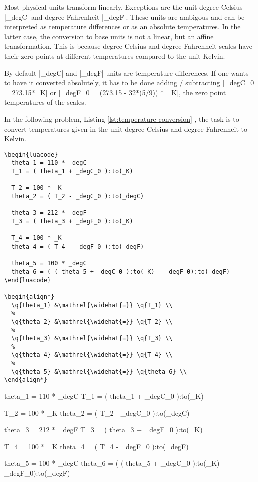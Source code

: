 \documentclass{ltxdoc}
\newcommand{\q}[1]{%
  \directlua{tex.print(physical.Quantity.tosiunitx(#1,"add-decimal-zero=true,scientific-notation=fixed,exponent-to-prefix=false"))}%
}
\begin{document}
Most physical units transform linearly. Exceptions are the unit degree Celsius |_degC| and degree Fahrenheit |_degF|. These units are ambigous and can be interpreted as temperature differences or as an absolute temperatures. In the latter case, the conversion to base units is not a linear, but an affine transformation. This is because degree Celsius and degree Fahrenheit scales have their zero points at different temperatures compared to the unit Kelvin. 

By default |_degC| and |_degF| units are temperature differences. If one wants to have it converted absolutely, it has to be done adding / subtracting  |_degC_0 = 273.15*_K| or |_degF_0 = (273.15 - 32*(5/9)) * _K|, 
the zero point temperatures of the scales.


In the following problem, Listing \ref{lst:temperature conversion} , the task is to convert temperatures given in the unit degree Celsius and degree Fahrenheit to Kelvin. 

\begin{lstlisting}[caption=Temperature conversion.,label=lst:temperature conversion]
\begin{luacode}
  theta_1 = 110 * _degC
  T_1 = ( theta_1 + _degC_0 ):to(_K)

  T_2 = 100 * _K
  theta_2 = ( T_2 - _degC_0 ):to(_degC)

  theta_3 = 212 * _degF
  T_3 = ( theta_3 + _degF_0 ):to(_K)

  T_4 = 100 * _K
  theta_4 = ( T_4 - _degF_0 ):to(_degF)

  theta_5 = 100 * _degC
  theta_6 = ( ( theta_5 + _degC_0 ):to(_K) - _degF_0):to(_degF)
\end{luacode}

\begin{align*}
  \q{theta_1} &\mathrel{\widehat{=}} \q{T_1} \\
  %
  \q{theta_2} &\mathrel{\widehat{=}} \q{T_2} \\
  %
  \q{theta_3} &\mathrel{\widehat{=}} \q{T_3} \\
  %
  \q{theta_4} &\mathrel{\widehat{=}} \q{T_4} \\
  %
  \q{theta_5} &\mathrel{\widehat{=}} \q{theta_6} \\
\end{align*}
\end{lstlisting}

\begin{luacode}
  theta_1 = 110 * _degC
  T_1 = ( theta_1 + _degC_0 ):to(_K)

  T_2 = 100 * _K
  theta_2 = ( T_2 - _degC_0 ):to(_degC)

  theta_3 = 212 * _degF
  T_3 = ( theta_3 + _degF_0 ):to(_K)

  T_4 = 100 * _K
  theta_4 = ( T_4 - _degF_0 ):to(_degF)

  theta_5 = 100 * _degC
  theta_6 = ( ( theta_5 + _degC_0 ):to(_K) - _degF_0):to(_degF)
\end{luacode}
\end{document}
